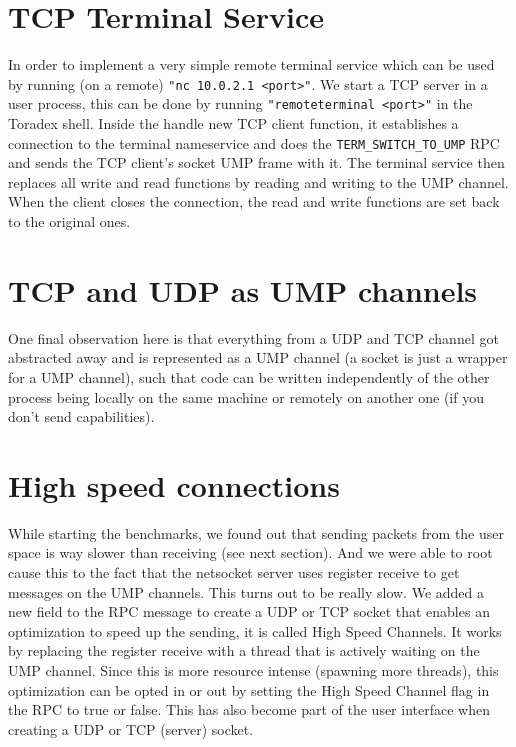 \section{TCP Terminal Service}

In order to implement a very simple remote terminal service which can be used by running (on a remote) \texttt{"nc 10.0.2.1 <port>"}. We start a TCP server in a user process, this can be done by running \texttt{"remoteterminal <port>"} in the Toradex shell.
Inside the handle new TCP client function, it establishes a connection to the terminal nameservice and does the \texttt{TERM_SWITCH_TO_UMP} RPC and sends the TCP client's socket UMP frame with it. The terminal service then replaces all write and read functions by reading and writing to the UMP channel. When the client closes the connection, the read and write functions are set back to the original ones. 

\section{TCP and UDP as UMP channels}
One final observation here is that everything from a UDP and TCP channel got abstracted away and is represented as a UMP channel (a socket is just a wrapper for a UMP channel), such that code can be written independently of the other process being locally on the same machine or remotely on another one (if you don't send capabilities).

\section{High speed connections}
\label{net:high_speed}

While starting the benchmarks, we found out that sending packets from the user space is way slower than receiving (see next section). And we were able to root cause this to the fact that the netsocket server uses register receive to get messages on the UMP channels. This turns out to be really slow. 
We added a new field to the RPC message to create a UDP or TCP socket that enables an optimization to speed up the sending, it is called High Speed Channels. It works by replacing the register receive with a thread that is actively waiting on the UMP channel. Since this is more resource intense (spawning more threads), this optimization can be opted in or out by setting the High Speed Channel flag in the RPC to true or false. This has also become part of the user interface when creating a UDP or TCP (server) socket.

